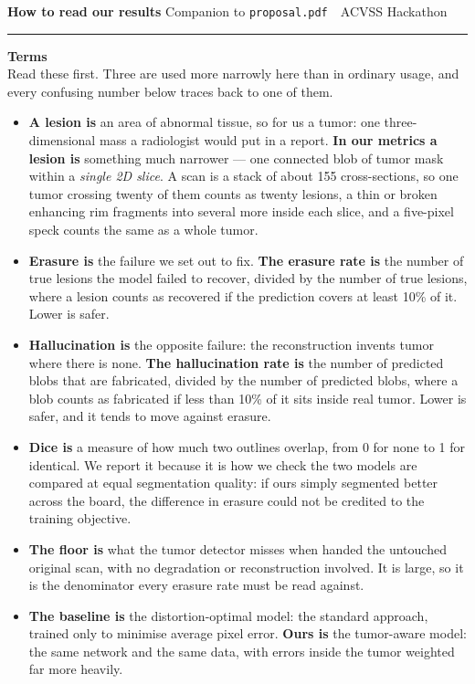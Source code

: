 \documentclass[11pt,a4paper]{article}
\newcommand{\headfont}{\sffamily}
\newcommand{\thinrule}{\noindent\textcolor{rule}{\rule{\linewidth}{0.6pt}}}
\begin{document}
{\headfont\Large\bfseries How to read our results}
\hfill{\color{muted}\small Companion to \texttt{proposal.pdf} \,\textperiodcentered\, ACVSS Hackathon}

\vspace{0.25em}
\thinrule
\vspace{0.2em}

{\headfont\normalsize\bfseries\color{ink} Terms}\\[0.1em]
Read these first. Three are used more narrowly here than in ordinary usage, and every
confusing number below traces back to one of them.

\begin{itemize}\small
  \item \textbf{A lesion is} an area of abnormal tissue, so for us a tumor: one
        three-dimensional mass a radiologist would put in a report. \textbf{In our metrics a
        lesion is} something much narrower --- one connected blob of tumor mask within a
        \emph{single 2D slice}. A scan is a stack of about 155 cross-sections, so one tumor
        crossing twenty of them counts as twenty lesions, a thin or broken enhancing rim
        fragments into several more inside each slice, and a five-pixel speck counts the same
        as a whole tumor.
  \item \textbf{Erasure is} the failure we set out to fix.
        \textbf{The erasure rate is} the number of true lesions the
        model failed to recover, divided by the number of true lesions, where a lesion counts
        as recovered if the prediction covers at least 10\% of it. Lower is safer.
  \item \textbf{Hallucination is} the opposite failure: the reconstruction invents tumor where
        there is none. \textbf{The hallucination rate is} the number of predicted blobs that
        are fabricated, divided by the number of predicted blobs, where a blob counts as
        fabricated if less than 10\% of it sits inside real tumor. Lower is safer, and it tends
        to move against erasure.
  \item \textbf{Dice is} a measure of how much two outlines overlap, from 0 for none to 1 for
        identical. We report it because it is how we check the two models are compared at equal
        segmentation quality: if ours simply segmented better across the board, the difference
        in erasure could not be credited to the training objective.
  \item \textbf{The floor is} what the tumor detector misses when handed the untouched original
        scan, with no degradation or reconstruction involved. It is large, so it is the
        denominator every erasure rate must be read against.
  \item \textbf{The baseline is} the distortion-optimal model: the standard approach, trained
        only to minimise average pixel error. \textbf{Ours is} the tumor-aware model: the same
        network and the same data, with errors inside the tumor weighted far more heavily.
\end{itemize}
\end{document}

